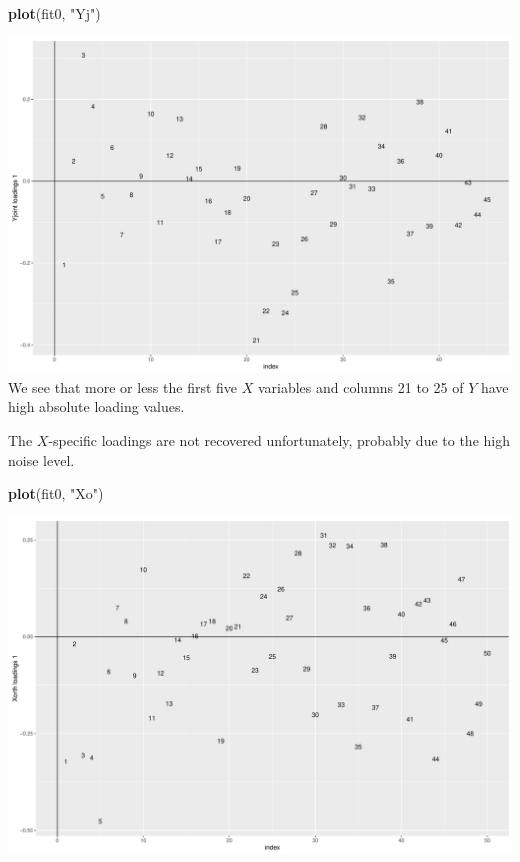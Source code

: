 \documentclass[]{article}
\newenvironment{Shaded}{\begin{snugshade}}{\end{snugshade}}
\newcommand{\KeywordTok}[1]{\textcolor[rgb]{0.13,0.29,0.53}{\textbf{{#1}}}}
\newcommand{\StringTok}[1]{\textcolor[rgb]{0.31,0.60,0.02}{{#1}}}
\newcommand{\NormalTok}[1]{{#1}}
\begin{document}
\begin{Shaded}
\begin{Highlighting}[]
\KeywordTok{plot}\NormalTok{(fit0, }\StringTok{"Yj"}\NormalTok{)}
\end{Highlighting}
\end{Shaded}

\includegraphics{Figs/unnamed-chunk-5-2.pdf} We see that more or less
the first five \(X\) variables and columns 21 to 25 of \(Y\) have high
absolute loading values.

The \(X\)-specific loadings are not recovered unfortunately, probably
due to the high noise level.

\begin{Shaded}
\begin{Highlighting}[]
\KeywordTok{plot}\NormalTok{(fit0, }\StringTok{"Xo"}\NormalTok{)}
\end{Highlighting}
\end{Shaded}

\includegraphics{Figs/unnamed-chunk-6-1.pdf}
\end{document}
